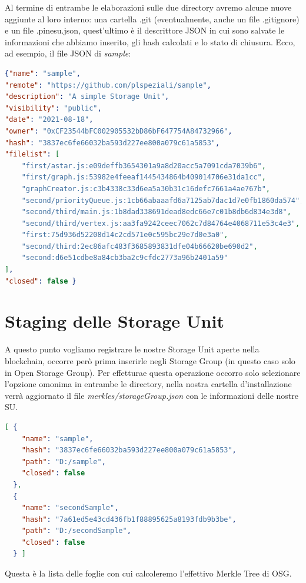 Al termine di entrambe le elaborazioni sulle due directory avremo alcune nuove aggiunte al loro interno:
una cartella .git (eventualmente, anche un file .gitignore) e un file .pinesu.json, quest'ultimo è
il descrittore JSON in cui sono salvate le informazioni che abbiamo inserito, gli hash calcolati e
lo stato di chiusura. Ecco, ad esempio, il file JSON di \emph{sample}:

\begin{lstlisting}[language=json,firstnumber=1]
{"name": "sample",
"remote": "https://github.com/plspeziali/sample",
"description": "A simple Storage Unit",
"visibility": "public",
"date": "2021-08-18",
"owner": "0xCF23544bFC002905532bD86bF647754A84732966",
"hash": "3837ec6fe66032ba593d227ee800a079c61a5853",
"filelist": [
    "first/astar.js:e09deffb3654301a9a8d20acc5a7091cda7039b6",
    "first/graph.js:53982e4feeaf1445434864b409014706e31da1cc",
    "graphCreator.js:c3b4338c33d6ea5a30b31c16defc7661a4ae767b",
    "second/priorityQueue.js:1cb66abaaafd6a7125ab7dac1d7e0fb1860da574",
    "second/third/main.js:1b8dad338691dead8edc66e7c01b8db6d834e3d8",
    "second/third/vertex.js:aa3fa9242ceec7062c7d84764e4068711e53c4e3",
    "first:75d936d52208d14c2cd571e0c595bc29e7d0e3a0",
    "second/third:2ec86afc483f3685893831dfe04b66620be690d2",
    "second:d6e51cdbe8a84cb3ba2c9cfdc2773a96b2401a59"
],
"closed": false }
\end{lstlisting}
\newpage

\section{Staging delle Storage Unit}

A questo punto vogliamo registrare le nostre Storage Unit aperte nella blockchain, 
occorre però prima inserirle negli Storage Group
(in questo caso solo in Open Storage Group).
Per effetturae questa operazione occorro solo selezionare l'opzione omonima
in entrambe le directory, nella nostra cartella d'installazione verrà 
aggiornato il file \emph{merkles/storageGroup.json} con le informazioni delle nostre SU.

\begin{lstlisting}[language=json,firstnumber=1]
[ {
    "name": "sample",
    "hash": "3837ec6fe66032ba593d227ee800a079c61a5853",
    "path": "D:/sample",
    "closed": false
  },
  {
    "name": "secondSample",
    "hash": "7a61ed5e43cd436fb1f88895625a8193fdb9b3be",
    "path": "D:/secondSample",
    "closed": false
  } ]  
\end{lstlisting}
Questa è la lista delle foglie con cui calcoleremo l'effettivo Merkle Tree di OSG.

